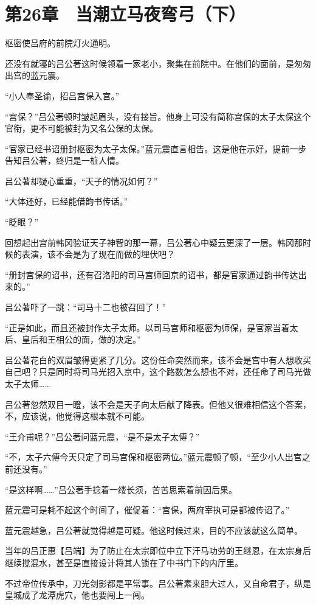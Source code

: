 \section{第26章　当潮立马夜弯弓（下）}

枢密使吕府的前院灯火通明。 

还没有就寝的吕公著这时候领着一家老小，聚集在前院中。在他们的面前，是匆匆出宫的蓝元震。 

“小人奉圣谕，招吕宫保入宫。” 

“宫保？”吕公著顿时皱起眉头，没有接旨。他身上可没有简称宫保的太子太保这个官衔，更不可能被封为又名公保的太保。 

“官家已经书诏册封枢密为太子太保。”蓝元震直言相告。这是他在示好，提前一步告知吕公著，终归是一桩人情。 

吕公著却疑心重重，“天子的情况如何？” 

“大体还好，已经能借韵书传话。” 

“眨眼？” 

回想起出宫前韩冈验证天子神智的那一幕，吕公著心中疑云更深了一层。韩冈那时候的表演，该不会是为了现在而做的埋伏吧？ 

“册封宫保的诏书，还有召洛阳的司马宫师回京的诏书，都是官家通过韵书传达出来的。” 

吕公著吓了一跳：“司马十二也被召回了！” 

“正是如此，而且还被封作太子太师。以司马宫师和枢密为师保，是官家当着太后、皇后和王相公的面，做的决定。” 

吕公著花白的双眉皱得更紧了几分。这份任命突然而来，该不会是宫中有人想收买自己吧？只是同时将司马光招入京中，这个路数怎么想也不对，还任命了司马光做太子太师…… 

吕公著忽然双目一瞪，该不会是天子向太后献了降表。但他又很难相信这个答案，不，应该说，他觉得这根本就不可能。 

“王介甫呢？”吕公著问蓝元震，“是不是太子太傅？” 

“不，太子六傅今天只定了司马宫保和枢密两位。”蓝元震顿了顿，“至少小人出宫之前还没有。” 

“是这样啊……”吕公著手捻着一缕长须，苦苦思索着前因后果。 

蓝元震可是耗不起这个时间了，催促着：“宫保，两府宰执可是都被传诏了。” 

蓝元震越急，吕公著就觉得越是可疑。他这时候过来，目的不应该就这么简单。 

当年的吕正惠【吕端】为了防止在太宗即位中立下汗马功劳的王继恩，在太宗身后继续搅混水，甚至是直接设计将其人锁在了中书门下的内厅里。 

不过帝位传承中，刀光剑影都是平常事。吕公著素来胆大过人，又自命君子，纵是皇城成了龙潭虎穴，他也要闯上一闯。 

